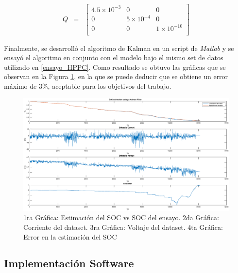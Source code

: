 \documentclass[10pt,a4paper]{article}
\begin{document}
\begin{equation}
    \begin{array}{llll}
	Q & = & \begin{bmatrix}
	    4.5\times10^{-3} & 0 & 0 \\
	    0 & 5\times10^{-4} & 0 \\
	    0 & 0 & 1\times10^{-10} \\
	\end{bmatrix} 
    \end{array} \nonumber
\end{equation}

Finalmente, se desarroll\'o el algoritmo de Kalman en un script de \emph{Matlab}
y se ensay\'o el algoritmo en conjunto con el modelo bajo el mismo set de datos
utilizado en \ref{ensayo_HPPC}. Como resultado se obtuvo las gr\'aficas que se
observan en la Figura \ref{kalman_result_matlab}, en la que se puede deducir que
se obtiene un error m\'aximo de 3\%, aceptable para los objetivos del trabajo.

\begin{figure}[h!]
    \begin{center}
        \includegraphics[width=1\textwidth]{kalman_result_matlab.eps}
        \caption{1ra Gr\'afica: Estimaci\'on del \acrshort{SOC} vs
        \acrshort{SOC} del ensayo. 2da Gr\'afica: Corriente del dataset. 3ra
        Gr\'afica: Voltaje del dataset. 4ta Gr\'afica: Error en la estimaci\'on
        del \acrshort{SOC}} 
        \label{kalman_result_matlab}
    \end{center}
\end{figure}

\newpage


\subsection{Implementación Software}
\end{document}
